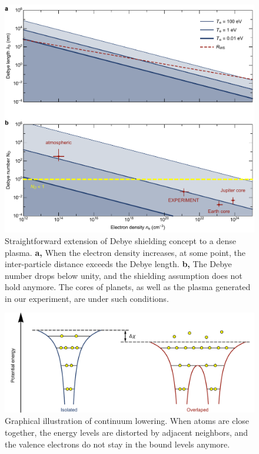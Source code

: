 \begin{figure}[ht!]
\centering
\includegraphics[width=130mm]{figures/ch3/Debye/number.pdf}
\caption{Straightforward extension of Debye shielding concept to a dense plasma. \textbf{a,} When the electron density increases, at some point, the inter-particle distance exceeds the Debye length. \textbf{b,} The Debye number drops below unity, and the shielding assumption does not hold anymore. The cores of planets, as well as the plasma generated in our experiment, are under such conditions.}
\label{fig:DebyeNumber}
\end{figure}

\begin{figure}[ht!]
\centering
\includegraphics[width=130mm]{figures/ch3/lowering/continuumLowering.pdf}
\caption{Graphical illustration of continuum lowering. When atoms are close together, the energy levels are distorted by adjacent neighbors, and the valence electrons do not stay in the bound levels anymore.}
\label{fig:continuumLowering}
\end{figure}

